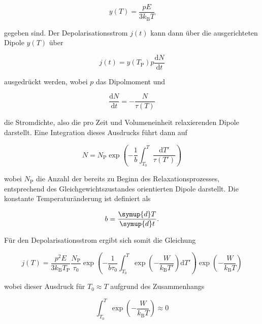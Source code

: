 \begin{equation}
    y(T) = \frac{p E}{3 k_{\text{B}} T} 
\end{equation}

gegeben sind. Der Depolarisationsstrom $j(t)$ kann dann über die ausgerichteten 
Dipole $y(T)$ über 

\begin{equation}
    j(t) = y(T_{\mathrm{P}}) p \frac{\mathrm{d}N}{\mathrm{d}t}
\end{equation}

ausgedrückt werden, wobei $p$ das Dipolmoment und 

\begin{equation}
    \frac{\mathrm{d}N}{\mathrm{d}t} = -\frac{N}{\tau(T)}
\end{equation}

die Stromdichte, also die pro Zeit und Volumeneinheit relaxierenden Dipole darstellt.
Eine Integration dieses Ausdrucks führt dann auf 

\begin{equation*}
    N = N_{\mathrm{P}} \exp{ \left( - \frac{ 1 }{ b } \int_{T_0}^T \frac{ \mathrm{d}T' }{ \tau(T') } \right )}
\end{equation*}

wobei $N_{\text{P}}$ die Anzahl der bereits zu Beginn des Relaxationsprozesses,
entsprechend des Gleichgewichtszustandes orientierten Dipole darstellt.
Die konstante Temperaturänderung ist definiert als

\begin{equation}
    b = \frac{\symup{d}T}{\symup{d}t}.
\end{equation}

Für den Depolarisationsstrom ergibt sich somit die Gleichung 

\begin{equation}
    j(T) = \frac{ p^{2} E }{ 3 k_{\mathrm{B}} T_{\mathrm{P}} } \frac{ N_{\mathrm{P}} }{ \tau_{\text{0}} } \exp{ \left( - \frac{ 1 }{ b \tau_{\text{0}} } \int_{T_{\text{0}}}^T \exp{ \left( - \frac{ W }{ k_{\mathrm{B}} T' } \right) \mathrm{d}T' } \right) } \exp{ \left( -\frac{ W }{ k_{\mathrm{B}} T } \right) } 
\end{equation}

wobei dieser Ausdruck für $T_{\text{0}} \approx T$ aufgrund des 
Zusammenhangs

\begin{equation*}
    \int_{T_{\text{0}}}^T \exp{ \left( - \frac{ W }{ k_{\mathrm{B}} T } \right )} \approx 0  
\end{equation*}


